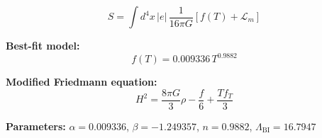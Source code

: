 
\begin{equation}
  S = \int d^4x \, |e| \, \frac{1}{16\pi G} \left[ f(T) + \mathcal{L}_m \right]
\end{equation}

\textbf{Best-fit model:}
\begin{equation}
  f(T) = 0.009336 \, T^{0.9882}
\end{equation}

\textbf{Modified Friedmann equation:}
\begin{equation}
  H^2 = \frac{8\pi G}{3} \rho - \frac{f}{6} + \frac{T f_T}{3}
\end{equation}

\textbf{Parameters:}
$\alpha = 0.009336$, \quad
$\beta = -1.249357$, \quad
$n = 0.9882$, \quad
$\Lambda_{\text{BI}} = 16.7947$